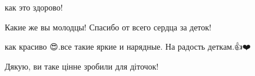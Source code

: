  
 
 
 
 

\qqSecCmt


как это здорово!


Какие же вы молодцы! Спасибо от всего сердца за деток! 💖


как красиво 😍.все такие яркие и нарядные. На радость деткам.👍❤️


Дякую, ви таке цінне зробили для діточок!
